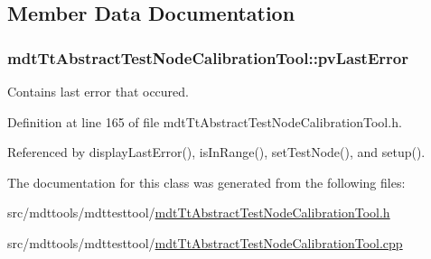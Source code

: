 \subsection{Member Data Documentation}
\hypertarget{classmdt_tt_abstract_test_node_calibration_tool_a8b6dbcbe8564eb7d2d4fbae1d6fa31b0}{
\subsubsection[{pv\-Last\-Error}]{ mdt\-Tt\-Abstract\-Test\-Node\-Calibration\-Tool\-::pv\-Last\-Error\hspace{0.3cm}{\ttfamily [protected]}}}\label{classmdt_tt_abstract_test_node_calibration_tool_a8b6dbcbe8564eb7d2d4fbae1d6fa31b0}


Contains last error that occured. 



Definition at line 165 of file mdt\-Tt\-Abstract\-Test\-Node\-Calibration\-Tool.\-h.



Referenced by display\-Last\-Error(), is\-In\-Range(), set\-Test\-Node(), and setup().



The documentation for this class was generated from the following files\-:\begin{DoxyCompactItemize}
\item 
src/mdttools/mdttesttool/\hyperlink{mdt_tt_abstract_test_node_calibration_tool_8h}{mdt\-Tt\-Abstract\-Test\-Node\-Calibration\-Tool.\-h}\item 
src/mdttools/mdttesttool/\hyperlink{mdt_tt_abstract_test_node_calibration_tool_8cpp}{mdt\-Tt\-Abstract\-Test\-Node\-Calibration\-Tool.\-cpp}\end{DoxyCompactItemize}
